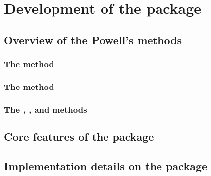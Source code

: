 %
%
%
\chapter{Development of the  package}

\section{Overview of the Powell's  methods}

\subsection{The  method}

\subsection{The  method}

\subsection{The , , and  methods}

\section{Core features of the  package}

\section{Implementation details on the  package}